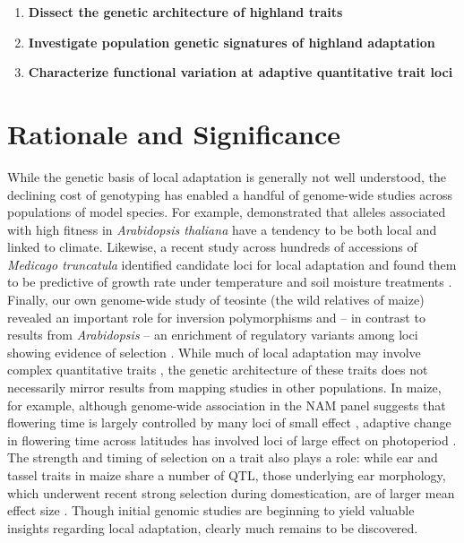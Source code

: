 \begin{enumerate}
\item {\bf Dissect the genetic architecture of highland traits}
\item {\bf Investigate population genetic signatures of highland adaptation}
\item {\bf Characterize functional variation at adaptive quantitative trait loci}
\end{enumerate}

\section*{Rationale and Significance}

While the genetic basis of local adaptation is generally not well understood, the declining cost of genotyping has enabled a handful of genome-wide studies across populations of model species.  For example, \citet{fournier2011map} demonstrated that alleles associated with high fitness in \emph{Arabidopsis thaliana} have a tendency to be both local and linked to climate.  Likewise, a recent study across hundreds of accessions of \emph{Medicago truncatula} identified candidate loci for local adaptation and found them to be predictive of growth rate under temperature and soil moisture treatments \citep{Yoder17012014}.  Finally, our own genome-wide study of teosinte (the wild relatives of maize) revealed  an important role for inversion polymorphisms and -- in contrast to results from \emph{Arabidopsis} \citep{hancock2011adaptation} -- an enrichment of regulatory variants among loci showing evidence of selection \citep{Pyhajarvi2013}. While much of local adaptation may involve complex quantitative traits \citep{le2012genetic}, the genetic architecture of these traits does not necessarily mirror results from mapping studies in other populations. In maize, for example, although genome-wide association in the NAM panel suggests that flowering time is largely controlled by many loci of small effect \citep{buckler2009genetic}, adaptive change in flowering time across latitudes has involved loci of large effect on photoperiod \citep{hung2012zmcct}. The strength and timing of selection on a trait also plays a role: while ear and tassel traits in maize share a number of QTL, those underlying ear morphology, which underwent recent strong selection during domestication, are of larger mean effect size \citep{Brown2011b}. Though initial genomic studies are beginning to yield valuable insights regarding local adaptation, clearly much remains to be discovered.  

